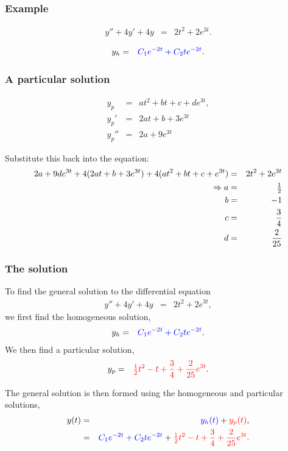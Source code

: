 \begin{frame}
  \frametitle{Example}

  \begin{eqnarray*}
    y'' + 4y' + 4y & = & 2t^2 + 2 e^{3t}.
  \end{eqnarray*}

  {
    \begin{eqnarray*}
      y_h & = & {\color{blue}C_1 e^{-2t} + C_2 t e^{-2t}}.
    \end{eqnarray*}
  }

\end{frame}


\begin{frame}
  \frametitle{A particular solution}

  \begin{eqnarray*}
    y_p & = & at^2 + bt + c + d e^{3t}, \\
    y_p' & = & 2at + b + 3e^{3t} \\
    y_p'' & = & 2a + 9 e^{3t}
  \end{eqnarray*}

  Substitute this back into the equation:
  \begin{eqnarray*}
    2a+9de^{3t}+4(2at+b + 3 e^{3t})+4(at^2+bt+c+e^{3t})&=&2t^2+2e^{3t}\\
    \Rightarrow
    a & = & \mbox{$\frac{1}{2}$} \\
    b & = & -1 \\
    c & = & \frac{3}{4} \\
    d & = & \frac{2}{25}
  \end{eqnarray*}

\end{frame}


\begin{frame}
  \frametitle{The  solution}

  To find the general solution to the differential equation
  \begin{eqnarray*}
    y'' + 4y' + 4y & = & 2t^2 + 2 e^{3t},
  \end{eqnarray*}
  we first find the homogeneous solution,
  \begin{eqnarray*}
    y_h & = & {\color{blue}C_1 e^{-2t} + C_2 t e^{-2t}}.
  \end{eqnarray*}
  We then find a particular solution,
  \begin{eqnarray*}
    y_p & = & {\color{red}\mbox{$\frac{1}{2}$} t^2 - t +  \frac{3}{4} + \frac{2}{25} e^{3t}}.
  \end{eqnarray*}

  The general solution is then formed using the homogeneous and particular solutions,
  \begin{eqnarray*}
    y(t) & = & {\color{blue}y_h(t)} + {\color{red}y_p(t)}, \\
         & = & {\color{blue}C_1 e^{-2t} + C_2 t e^{-2t}} + {\color{red}\mbox{$\frac{1}{2}$} t^2 - t + \frac{3}{4} + \frac{2}{25} e^{3t}}.
  \end{eqnarray*}

\end{frame}



